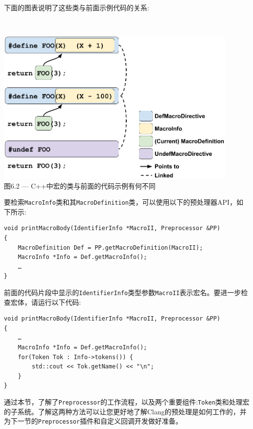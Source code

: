 下面的图表说明了这些类与前面示例代码的关系:

\hspace*{\fill} \\ %
\begin{center}
\includegraphics[width=0.9\textwidth]{content/2/chapter6/images/2.png}\\
图6.2 — C++中宏的类与前面的代码示例有何不同
\end{center}

要检索\texttt{MacroInfo}类和其\texttt{MacroDefinition}类，可以使用以下的预处理器API，如下所示:

\begin{lstlisting}[style=styleCXX]
void printMacroBody(IdentifierInfo *MacroII, Preprocessor &PP)
{
	MacroDefinition Def = PP.getMacroDefinition(MacroII);
	MacroInfo *Info = Def.getMacroInfo();
	…
}
\end{lstlisting}

前面的代码片段中显示的\texttt{IdentifierInfo}类型参数\texttt{MacroII}表示宏名。要进一步检查宏体，请运行以下代码:

\begin{lstlisting}[style=styleCXX]
void printMacroBody(IdentifierInfo *MacroII, Preprocessor &PP)
{
	…
	MacroInfo *Info = Def.getMacroInfo();
	for(Token Tok : Info->tokens()) {
		std::cout << Tok.getName() << "\n";
	}
}
\end{lstlisting}

通过本节，了解了\texttt{Preprocessor}的工作流程，以及两个重要组件:\texttt{Token}类和处理宏的子系统。了解这两种方法可以让您更好地了解Clang的预处理是如何工作的，并为下一节的\texttt{Preprocessor}插件和自定义回调开发做好准备。






























